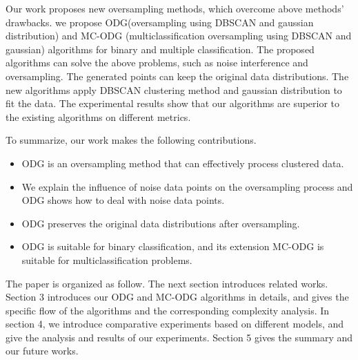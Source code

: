 \documentclass[ida]{iosart2x}
\begin{document}

Our work proposes new oversampling methods, which overcome above methods' drawbacks.
we propose ODG(oversampling using DBSCAN and gaussian distribution) and MC-ODG
(multiclassification oversampling using DBSCAN and gaussian) algorithms 
for binary and multiple classification.
The proposed algorithms can solve the above problems, such as noise interference and oversampling. 
The generated points can keep the original data distributions.
The new algorithms apply DBSCAN clustering method and gaussian
distribution to fit the data.
The experimental results show that our algorithms are superior 
to the existing algorithms on different metrics.

To summarize, our work makes the following contributions.
\begin{itemize}
  \item ODG is an oversampling method that can effectively process clustered data.
  \item We explain the influence of noise data points on the oversampling process and ODG shows how to deal with noise data points.
  \item ODG preserves the original data distributions after oversampling.
  \item ODG is suitable for binary classification, and its extension MC-ODG is suitable for multiclassification problems.
\end{itemize}

The paper is organized as follow. The next section introduces 
related works. Section 3 introduces our ODG and MC-ODG 
algorithms in details, 
and gives the specific flow of the algorithms and the corresponding complexity analysis.
In section 4, we introduce comparative experiments based on different models, 
and give the analysis and results of our experiments. Section 5 gives the summary and our future works.
\end{document}
